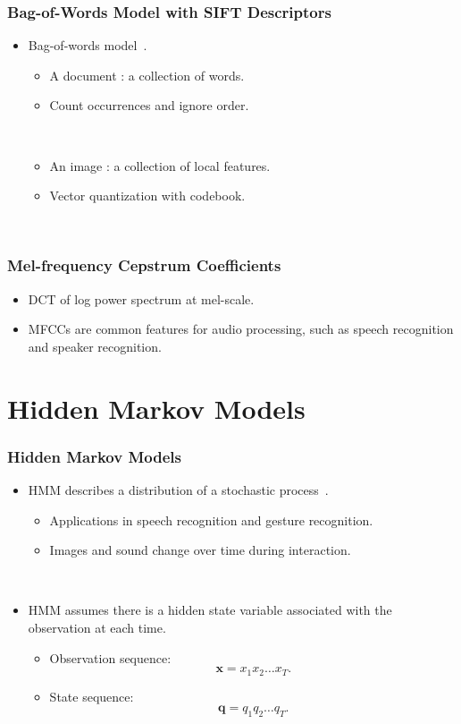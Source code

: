 \documentclass{beamer}
\begin{document}
\begin{frame}
  \frametitle{Bag-of-Words Model with SIFT Descriptors}

  \begin{itemize}
    \item Bag-of-words model~\cite{csurka_visual_2004}. 
      \begin{itemize}
        \item A document : a collection of words.
        \item Count occurrences and ignore order. 

          ~
        \item An image : a collection of local features.
        \item Vector quantization with codebook.
      \end{itemize}
      ~
  \end{itemize}
\end{frame}

\begin{frame}
  \frametitle{Mel-frequency Cepstrum Coefficients}

  \begin{itemize}
    \item DCT of log power spectrum at mel-scale.
    \item MFCCs are common features for audio processing, such as speech recognition and speaker recognition.
  \end{itemize}
\end{frame}

\section{Hidden Markov Models}
\begin{frame}
  \frametitle{Hidden Markov Models}

  \begin{itemize}
    \item HMM describes a distribution of a stochastic process~\cite{rabiner_fundamentals_1993}.
      \begin{itemize}
        \item Applications in speech recognition and gesture recognition. 
        \item Images and sound change over time during interaction.
      \end{itemize}
      ~

    \item HMM assumes there is a hidden state variable associated with the observation at each time.
      \begin{itemize}
        \item Observation sequence: \[ \mathbf{x} = x_1 x_2 \dots x_T . \]
        \item State sequence: \[ \mathbf{q} = q_1 q_2 \dots q_T . \]
      \end{itemize}
  \end{itemize}
\end{frame}
\end{document}
